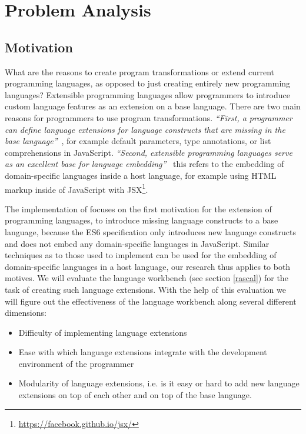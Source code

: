 
\chapter{Problem Analysis} %

\label{Chapter2}


\section{Motivation}
What are the reasons to create program transformations or extend current programming languages, as opposed to just creating entirely new programming languages? Extensible programming languages allow programmers to introduce custom language features as an extension on a base language.  There are two main reasons for programmers to use program transformations. \textit{``First, a programmer can define language extensions for language constructs that are missing in the base language''}~\cite{Erdweg2014a}, for example default parameters, type annotations, or list comprehensions in JavaScript. \textit{``Second, extensible programming languages serve as an excellent base for language embedding''}~\cite{Erdweg2014a} this refers to the embedding of domain-specific languages inside a host language, for example using HTML markup inside of JavaScript with JSX\footnote{\url{https://facebook.github.io/jsx/}}.

The implementation of \projectname focuses on the first motivation for the extension of programming languages, to introduce missing language constructs to a base language, because the ES6 specification only introduces new language constructs and does not embed any domain-specific languages in JavaScript. Similar techniques as to those used to implement \projectname can be used for the embedding of domain-specific languages in a host language, our research thus applies to both motives. We will evaluate the language workbench (see section \ref{rascal}) for the task of creating such language extensions. With the help of this evaluation we will figure out the effectiveness of the language workbench along several different dimensions:

\begin{itemize}
	\item Difficulty of implementing language extensions
	\item Ease with which language extensions integrate with the development environment of the programmer
	\item Modularity of language extensions, i.e. is it easy or hard to add new language extensions on top of each other and on top of the base language.
\end{itemize}

